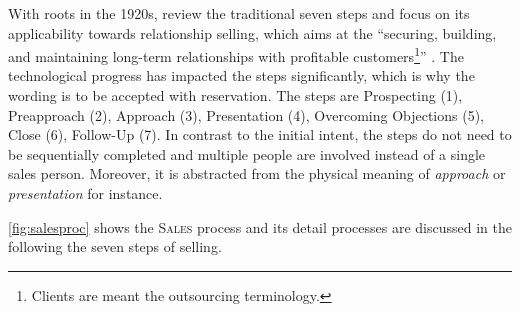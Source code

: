 	With roots in the 1920s, \cite{Moncrief_2005} review the traditional seven steps and focus on its applicability towards relationship selling, which aims at the \enquote{securing, building, and maintaining long-term relationships with profitable customers\footnote{ Clients are meant the outsourcing terminology.}} \citep[]{Moncrief_2005}. The technological progress has impacted the steps significantly, which is why the wording is to be accepted with reservation. The steps are Prospecting (1), Preapproach (2), Approach (3), Presentation (4), Overcoming Objections (5), Close (6), Follow-Up (7). In contrast to the initial intent, the steps do not need to be sequentially completed and multiple people are involved instead of a single sales person. Moreover, it is abstracted from the physical meaning of \textit{approach} or \textit{presentation} for instance.
	
	\Fig \ref{fig:salesproc} shows the \textsc{Sales} process and its detail processes are discussed in the following \wrt the seven steps of selling.  
	
